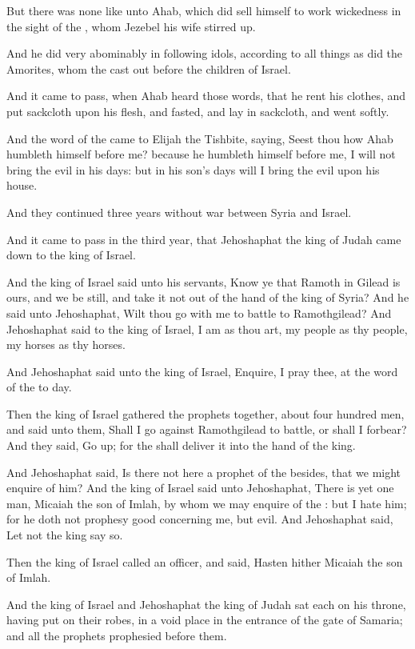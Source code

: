 \Verse But there was none like unto Ahab, which did sell himself to work wickedness in the sight of the \LORD, whom Jezebel his wife stirred up.

\Verse And he did very abominably in following idols, according to all things as did the Amorites, whom the \LORD cast out before the children of Israel.

\Verse And it came to pass, when Ahab heard those words, that he rent his clothes, and put sackcloth upon his flesh, and fasted, and lay in sackcloth, and went softly.

\Verse And the word of the \LORD came to Elijah the Tishbite, saying, \Verse Seest thou how Ahab humbleth himself before me? because he humbleth himself before me, I will not bring the evil in his days: but in his son's days will I bring the evil upon his house.


\Chapter
\Verse And they continued three years without war between Syria and Israel.

\Verse And it came to pass in the third year, that Jehoshaphat the king of Judah came down to the king of Israel.

\Verse And the king of Israel said unto his servants, Know ye that Ramoth in Gilead is ours, and we be still, and take it not out of the hand of the king of Syria?  \Verse And he said unto Jehoshaphat, Wilt thou go with me to battle to Ramothgilead? And Jehoshaphat said to the king of Israel, I am as thou art, my people as thy people, my horses as thy horses.

\Verse And Jehoshaphat said unto the king of Israel, Enquire, I pray thee, at the word of the \LORD to day.

\Verse Then the king of Israel gathered the prophets together, about four hundred men, and said unto them, Shall I go against Ramothgilead to battle, or shall I forbear? And they said, Go up; for the \LORD shall deliver it into the hand of the king.

\Verse And Jehoshaphat said, Is there not here a prophet of the \LORD besides, that we might enquire of him?  \Verse And the king of Israel said unto Jehoshaphat, There is yet one man, Micaiah the son of Imlah, by whom we may enquire of the \LORD: but I hate him; for he doth not prophesy good concerning me, but evil. And Jehoshaphat said, Let not the king say so.

\Verse Then the king of Israel called an officer, and said, Hasten hither Micaiah the son of Imlah.

\Verse And the king of Israel and Jehoshaphat the king of Judah sat each on his throne, having put on their robes, in a void place in the entrance of the gate of Samaria; and all the prophets prophesied before them.

